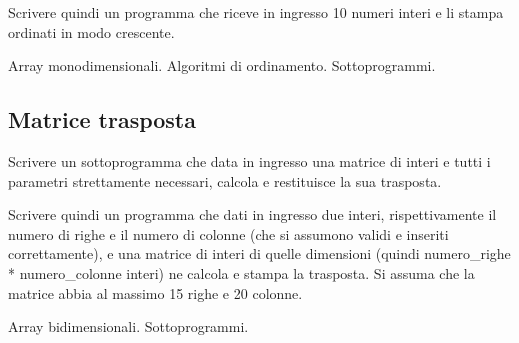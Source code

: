 Scrivere quindi un programma che riceve in ingresso 10 numeri interi e li stampa ordinati in modo crescente.

\begin{tags}
Array monodimensionali. Algoritmi di ordinamento. Sottoprogrammi.
\end{tags}


\subsection{Matrice trasposta}
Scrivere un sottoprogramma che data in ingresso una matrice di interi e tutti i parametri strettamente necessari,
calcola e restituisce la sua trasposta.

Scrivere quindi un programma che dati in ingresso due interi, rispettivamente il numero di righe e il numero
di colonne  (che si assumono validi e inseriti correttamente), e una matrice di interi di quelle dimensioni
(quindi numero\_righe * numero\_colonne interi) ne calcola e stampa la trasposta.
Si assuma che la matrice abbia al massimo 15 righe e 20 colonne.

\begin{tags}
Array bidimensionali. Sottoprogrammi.
\end{tags}
